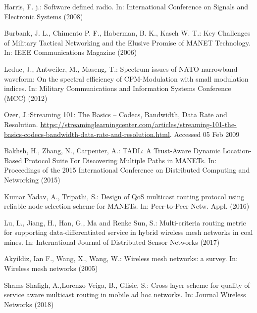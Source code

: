 \documentclass[runningheads]{llncs}
\begin{document}
%
%
%
%
\begin{thebibliography}{5}
%

Harris, F. j.: Software defined radio. In: International Conference on Signals and Electronic Systems (2008) 

Burbank, J. L., Chimento P. F., Haberman, B. K., Kasch W. T.: Key Challenges of Military Tactical Networking and the Elusive Promise of MANET Technology. In: IEEE Communications Magazine (2006)

Leduc, J., Antweiler, M., Maseng, T.: Spectrum issues of NATO narrowband waveform: On the spectral efficiency of CPM-Modulation with small modulation indices. In: Military Communications and Information Systems Conference (MCC) (2012)

Ozer, J.:Streaming 101: The Basics – Codecs, Bandwidth, Data Rate and Resolution. \url{https://streaminglearningcenter.com/articles/streaming-101-the-basics-codecs-bandwidth-data-rate-and-resolution.html}. Accessed 05 Feb 2009

Bakhsh, H., Zhang, N., Carpenter, A.: TADL: A Trust-Aware Dynamic Location-Based Protocol Suite For Discovering Multiple Paths in MANETs. In: Proceedings of the 2015 International Conference on Distributed Computing and Networking (2015)

Kumar Yadav, A., Tripathi, S.: Design of QoS multicast routing protocol using reliable node selection scheme for MANETs. In: Peer-to-Peer Netw. Appl. (2016)

Lu, L., Jiang, H., Han, G., Ma and Renke Sun, S.: Multi-criteria routing metric for supporting data-differentiated service in hybrid wireless mesh networks in coal mines. In: International Journal of Distributed Sensor Networks (2017)

Akyildiz, Ian F., Wang, X., Wang, W.: Wireless mesh networks: a survey. In: Wireless mesh networks (2005)

Shams Shafigh, A.,Lorenzo Veiga, B., Glisic, S.: Cross layer scheme for quality of service aware multicast routing in mobile ad hoc networks. In: Journal
Wireless Networks (2018)


\end{thebibliography}
\end{document}
